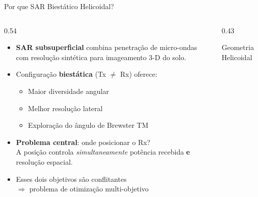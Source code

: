 \documentclass[aspectratio=169, 10pt]{beamer}
\begin{document}
\begin{frame}{Por que SAR Biestático Helicoidal?}
  \begin{columns}[T]
    \begin{column}{0.54\textwidth}
      \begin{itemize}
        \item \textbf{SAR subsuperficial} combina penetração de micro-ondas
              com resolução sintética para imageamento 3-D do solo.
        \vspace{0.5em}
        \item Configuração \textbf{biestática} (Tx $\neq$ Rx) oferece:
          \begin{itemize}
            \item Maior diversidade angular
            \item Melhor resolução lateral
            \item Exploração do ângulo de Brewster TM
          \end{itemize}
        \vspace{0.5em}
        \item \textbf{Problema central}: onde posicionar o Rx?\\[0.3em]
              A posição controla \emph{simultaneamente}
              potência recebida \textbf{e} resolução espacial.
        \vspace{0.5em}
        \item Esses dois objetivos são \alert{conflitantes}\\
              $\Rightarrow$ problema de otimização multi-objetivo
      \end{itemize}
    \end{column}
    \begin{column}{0.43\textwidth}
      \begin{block}{Geometria Helicoidal}
        \centering
\end{block}
\end{column}
\end{columns}
\end{frame}
\end{document}
